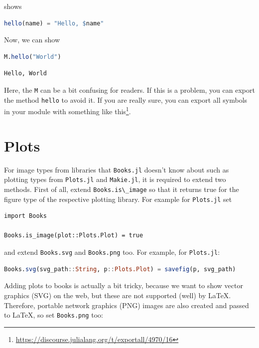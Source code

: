 \documentclass[
  notoc %
]{tufte-book}
\DeclareRobustCommand{\href}[2]{#2\footnote{\url{#1}}}
\newcommand{\passthrough}[1]{#1}
\begin{document}
shows

\begin{lstlisting}[language=Julia]
hello(name) = "Hello, $name"
\end{lstlisting}

Now, we can show

\begin{lstlisting}[language=Julia]
M.hello("World")
\end{lstlisting}

\begin{lstlisting}[language=Output]
Hello, World
\end{lstlisting}

Here, the \passthrough{\lstinline!M!} can be a bit confusing for
readers. If this is a problem, you can export the method
\passthrough{\lstinline!hello!} to avoid it. If you are really sure, you
can export all symbols in your module with something like
\href{https://discourse.julialang.org/t/exportall/4970/16}{this}.

\hypertarget{sec:plots}{%
\section{Plots}\label{sec:plots}}

For image types from libraries that \passthrough{\lstinline!Books.jl!}
doesn't know about such as plotting types from
\passthrough{\lstinline!Plots.jl!} and
\passthrough{\lstinline!Makie.jl!}, it is required to extend two
methods. First of all, extend \passthrough{\lstinline!Books.is\_image!}
so that it returns true for the figure type of the respective plotting
library. For example for \passthrough{\lstinline!Plots.jl!} set

\begin{lstlisting}
import Books

Books.is_image(plot::Plots.Plot) = true
\end{lstlisting}

and extend \passthrough{\lstinline!Books.svg!} and
\passthrough{\lstinline!Books.png!} too. For example, for
\passthrough{\lstinline!Plots.jl!}:

\begin{lstlisting}[language=Julia]
Books.svg(svg_path::String, p::Plots.Plot) = savefig(p, svg_path)
\end{lstlisting}

Adding plots to books is actually a bit tricky, because we want to show
vector graphics (SVG) on the web, but these are not supported (well) by
LaTeX. Therefore, portable network graphics (PNG) images are also
created and passed to LaTeX, so set \passthrough{\lstinline!Books.png!}
too:
\end{document}
